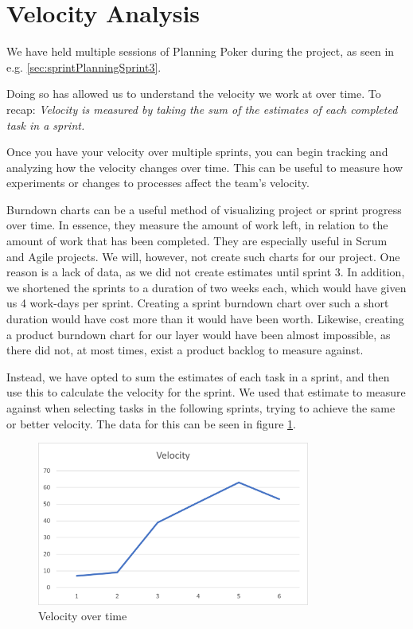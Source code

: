 \section{Velocity Analysis}\label{sec:velocityAnalysis}
We have held multiple sessions of Planning Poker during the project, as seen in e.g. \ref{sec:sprintPlanningSprint3}.

Doing so has allowed us to understand the velocity we work at over time. To recap: \textit{Velocity is measured by taking the sum of the estimates of each completed task in a sprint\cite{sutherlandScrumArtDoing2014}.}

Once you have your velocity over multiple sprints, you can begin tracking and analyzing how the velocity changes over time. This can be useful to measure how experiments or changes to processes affect the team's velocity.

Burndown charts can be a useful method of visualizing project or sprint progress over time. In essence, they measure the amount of work left, in relation to the amount of work that has been completed. They are especially useful in Scrum and Agile projects\cite{HowCreateBurndown2021}. We will, however, not create such charts for our project. One reason is a lack of data, as we did not create estimates until sprint 3.
In addition, we shortened the sprints to a duration of two weeks each, which would have given us 4 work-days per sprint. Creating a sprint burndown chart over such a short duration would have cost more than it would have been worth.
Likewise, creating a product burndown chart for our layer would have been almost impossible, as there did not, at most times, exist a product backlog to measure against.

Instead, we have opted to sum the estimates of each task in a sprint, and then use this to calculate the velocity for the sprint. We used that estimate to measure against when selecting tasks in the following sprints, trying to achieve the same or better velocity. The data for this can be seen in figure \ref{img:velocityOverTime}.

\begin{figure}[h!]
\centering
\includegraphics[width=0.8\textwidth]{Images/VelocityAnalysis.png}
\caption{Velocity over time}
\label{img:velocityOverTime}
\end{figure}

